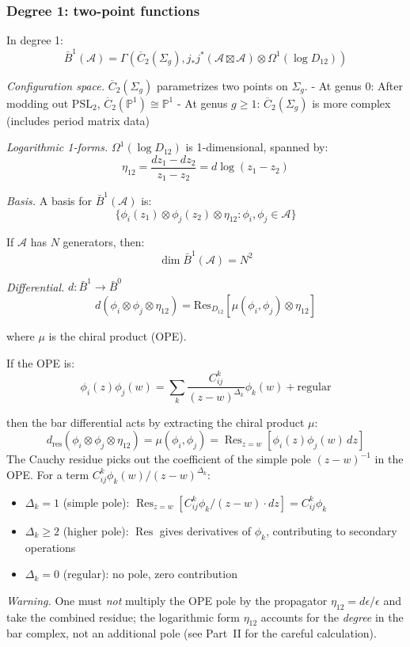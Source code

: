 \subsubsection{Degree 1: two-point functions}

\begin{computation}\label{comp:deg1-general}
In degree 1:
\[\bar{B}^1(\mathcal{A}) = \Gamma\left(\overline{C}_2(\Sigma_g), j_*j^*(\mathcal{A} \boxtimes \mathcal{A}) \otimes \Omega^1(\log D_{12})\right)\]

\emph{Configuration space.} $\overline{C}_2(\Sigma_g)$ parametrizes two points on $\Sigma_g$.
- At genus 0: After modding out $\text{PSL}_2$, $\overline{C}_2(\mathbb{P}^1) \cong \mathbb{P}^1$
- At genus $g \geq 1$: $\overline{C}_2(\Sigma_g)$ is more complex (includes period matrix data)

\emph{Logarithmic 1-forms.} $\Omega^1(\log D_{12})$ is 1-dimensional, spanned by:
\[\eta_{12} = \frac{dz_1 - dz_2}{z_1 - z_2} = d\log(z_1 - z_2)\]

\emph{Basis.} A basis for $\bar{B}^1(\mathcal{A})$ is:
\[\{\phi_i(z_1) \otimes \phi_j(z_2) \otimes \eta_{12} : \phi_i, \phi_j \in \mathcal{A}\}\]

If $\mathcal{A}$ has $N$ generators, then:
\[\dim \bar{B}^1(\mathcal{A}) = N^2\]

\emph{Differential.} $d: \bar{B}^1 \to \bar{B}^0$
\[d(\phi_i \otimes \phi_j \otimes \eta_{12}) = \text{Res}_{D_{12}}[\mu(\phi_i, \phi_j) \otimes \eta_{12}]\]

where $\mu$ is the chiral product (OPE).

If the OPE is:
\[\phi_i(z)\phi_j(w) = \sum_k \frac{C_{ij}^k}{(z-w)^{\Delta_k}} \phi_k(w) + \text{regular}\]

then the bar differential acts by extracting the chiral product $\mu$:
\[d_{\mathrm{res}}(\phi_i \otimes \phi_j \otimes \eta_{12}) = \mu(\phi_i, \phi_j) = \operatorname{Res}_{z=w}\left[\phi_i(z)\phi_j(w)\,dz\right]\]
The Cauchy residue picks out the coefficient of the simple pole $(z-w)^{-1}$ in the OPE.  For a term $C_{ij}^k \phi_k(w)/(z-w)^{\Delta_k}$:
\begin{itemize}
\item $\Delta_k = 1$ (simple pole): $\operatorname{Res}_{z=w}[C_{ij}^k \phi_k/(z{-}w) \cdot dz] = C_{ij}^k \phi_k$
\item $\Delta_k \geq 2$ (higher pole): $\operatorname{Res}$ gives derivatives of $\phi_k$, contributing to secondary operations
\item $\Delta_k = 0$ (regular): no pole, zero contribution
\end{itemize}
\emph{Warning.} One must \emph{not} multiply the OPE pole by the propagator $\eta_{12} = d\epsilon/\epsilon$ and take the combined residue; the logarithmic form $\eta_{12}$ accounts for the \emph{degree} in the bar complex, not an additional pole (see Part~II for the careful calculation).
\end{computation}

